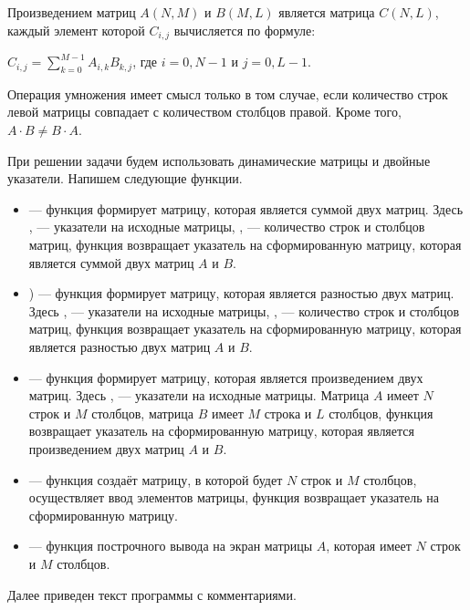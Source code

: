 Произведением матриц $A(N,M)$ и $B(M,L)$ является матрица $C(N,L)$, каждый элемент которой  $C_{i,j}$ вычисляется по формуле:

 $C_{i,j}=\sum\limits_{k=0}^{M-1}A_{i,k}B_{k,j}$, где $i = 0, N-1$ и $j = 0, L-1$. 

Операция умножения имеет смысл только в том случае, если количество строк левой матрицы совпадает с количеством столбцов
правой. Кроме того,  $A\cdot B\neq B\cdot A$. 

При решении задачи будем использовать динамические матрицы и двойные указатели. Напишем следующие функции.

\begin{itemize}
\item {} --- функция формирует матрицу, которая является суммой двух
матриц. Здесь ,  --- указатели на исходные матрицы, ,  --- количество строк и столбцов матриц, функция возвращает
указатель на сформированную матрицу, которая является суммой двух матриц $A$ и $B$.
\item {})  --- функция формирует матрицу, которая является разностью двух
матриц. Здесь ,  --- указатели на исходные матрицы, ,  --- количество строк и столбцов матриц, функция возвращает
указатель на сформированную матрицу, которая является разностью двух матриц $A$ и $B$.
\item {} --- функция формирует матрицу, которая является
произведением двух матриц. Здесь ,  --- указатели на исходные матрицы. 
Матрица $A$ имеет $N$ строк и $M$ столбцов, матрица $B$ имеет $M$ строка и $L$ столбцов, функция возвращает указатель 
на сформированную матрицу, которая является произведением
двух матриц $A$ и $B$.
\item {} --- функция создаёт матрицу, в которой будет $N$ строк и $M$ столбцов, 
осуществляет ввод элементов матрицы, функция возвращает указатель на сформированную матрицу.
\item {} --- функция построчного вывода на экран матрицы $A$, которая 
имеет $N$ строк и $M$ столбцов.
\end{itemize}
Далее приведен текст программы с комментариями.
